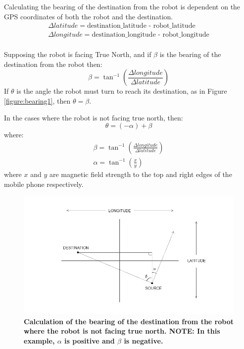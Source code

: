\documentclass[titlepage,12pt,a4paper]{article}
\begin{document}
Calculating the bearing of the destination from the robot is dependent on the GPS coordinates of both the robot and the destination.
\begin{equation}
	\begin{split}
		\Delta{latitude} = \text{destination\_latitude - robot\_latitude}\\
		\Delta{longitude} = \text{destination\_longitude - robot\_longitude}\\
	\end{split}
\end{equation}

Supposing the robot is facing True North, and if $\beta$ is the bearing of the destination from the robot then:
\begin{equation}
	\beta = \tan^{-1}({\frac{\Delta{longitude}}{\Delta{latitude}}})
\end{equation}
If $\theta$ is the angle the robot must turn to reach its destination, as in Figure \ref{figure:bearing1}, then $\theta = \beta$.

\pagebreak

In the cases where the robot is not facing true north, then:
\begin{equation}
	\theta =	(-\alpha) + \beta
	\label{equation:desired_heading}
\end{equation}
where:
\begin{equation}
\begin{split}
	\beta =	\tan^{-1}({\frac{\Delta{longitude}}{\Delta{latitude}}})\\
	\alpha = \tan^{-1}(\frac{x}{y})
\end{split}
\end{equation}
where $x$ and $y$ are magnetic field strength to the top and right edges of the mobile phone respectively.

\begin{figure}[h]
	\centering
	\includegraphics[scale=0.6]{figures/bearingsOffset.png}
	\caption{\textbf{Calculation of the bearing of the destination from the robot where the robot is not facing true north. NOTE: In this example, $\alpha$ is positive and $\beta$ is negative.}}
\end{figure}
\end{document}
